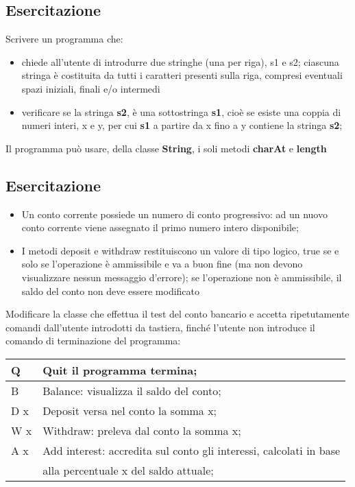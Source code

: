 \subsection*{Esercitazione}
\begin{frame}
\begin{block}{}
Scrivere un programma che:
\begin{itemize}
\item chiede all'utente di introdurre due stringhe (una per riga), s1 e s2; ciascuna stringa è costituita da tutti i caratteri 
presenti sulla riga, compresi eventuali spazi iniziali, finali e/o intermedi
\item verificare se la stringa \textbf{s2}, è una sottostringa \textbf{s1}, cioè se esiste una coppia di numeri interi, x e y, per
cui \textbf{s1} a partire da x fino a y contiene la stringa \textbf{s2};
\end{itemize}
\end{block}
\begin{block}{}
Il programma può usare, della classe \textbf{String}, i soli metodi \textbf{charAt} e \textbf{length}
\end{block}
\end{frame}

\subsection*{Esercitazione}
\begin{frame}
\begin{itemize}
\item Un conto corrente possiede un numero di conto progressivo: ad un nuovo conto corrente viene assegnato il primo numero intero
disponibile;
\item I metodi deposit e withdraw restituiscono un valore di tipo logico, true se e solo se l'operazione è ammissibile e va a buon fine (ma non devono visualizzare nessun messaggio d'errore); se l'operazione non è ammissibile, il saldo del conto non deve essere modificato
\end{itemize}
Modificare la classe che effettua il test del conto bancario e accetta ripetutamente comandi dall'utente introdotti	da tastiera,
finché l'utente non introduce il comando di terminazione del programma:
\begin{table}\footnotesize
\begin{tabular}{|l|l|}
\hline
Q & Quit il programma termina;\\
\hline
B & Balance: visualizza il saldo del conto;\\
\hline
D x & Deposit versa nel conto la somma x;\\
\hline
W x & Withdraw: preleva dal conto la somma x;\\
\hline
A x & Add interest: accredita sul conto gli interessi, calcolati in base\\ & alla percentuale x del saldo attuale;\\
\hline
\end{tabular}
\end{table}
\end{frame}

